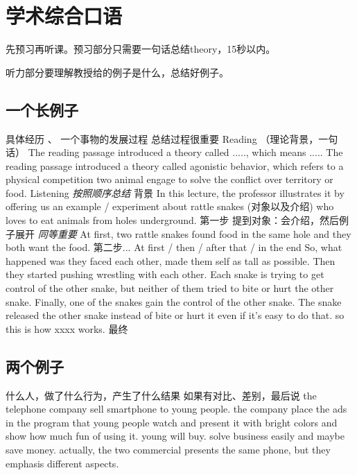 \documentclass{ctexart}
\begin{document}
\section{学术综合口语}
先预习再听课。预习部分只需要一句话总结theory，15秒以内。

听力部分要理解教授给的例子是什么，总结好例子。
\subsection{一个长例子}
\begin{outline}
    \1 具体经历 、 一个事物的发展过程
        \2 总结过程很重要
    \1 Reading （理论背景，一句话）
        \2 The reading passage introduced a theory called ....., which means .....
        \2 The reading passage introduced a theory called agonistic behavior, which refers to a physical competition two animal engage to solve the conflict over territory or food.
    \1 Listening
        \2 \emph{按照顺序总结}
        \2 背景
            \3 In this lecture, the professor illustrates it by offering us an example / experiment about rattle snakes (对象以及介绍) who loves to eat animals from holes underground.
        \2 第一步
            \3 提到对象：会介绍，然后例子展开
            \3 \emph{同等重要}
            \3 At first, two rattle snakes found food in the same hole and they both want the food.
        \2 第二步...
            \3 At first / then / after that / in the end
            \3 So, what happened was they faced each other, made them self as tall as possible.
            \3 Then they started pushing wrestling with each other.
            \3 Each snake is trying to get control of the other snake, but neither of them tried to bite or hurt the other snake.
            \3 Finally, one of the snakes gain the control of the other snake. The snake released the other snake instead of bite or hurt it even if it's easy to do that.
            \3 so this is how xxxx  works.
        \2 最终
\end{outline}
\subsection{两个例子}

\begin{outline}
    \1 什么人，做了什么行为，产生了什么结果
    \1 如果有对比、差别，最后说
        \2 the telephone company sell smartphone to young people.
        \2 the company place the ads in the program that young people watch and present it with bright colors and show how much fun of using it.
        \2 young will buy.
        \2 solve business easily and maybe save money.
        \2 actually, the two commercial presents the same phone, but they emphasis different aspects.
\end{outline}
\end{document}
